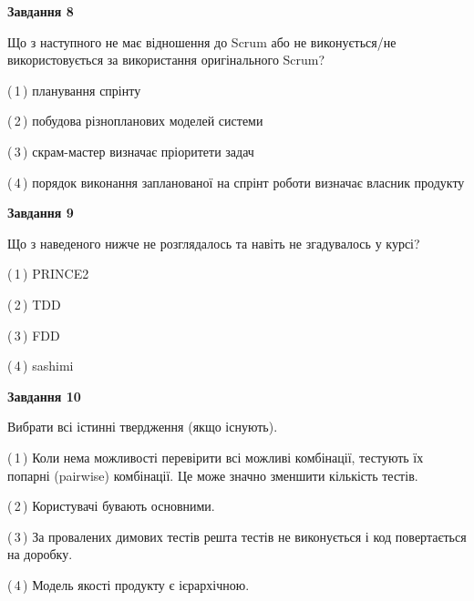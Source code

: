 \documentclass[10pt, ukrainian]{article}
\begin{document}
{\begin {large}
{\begin {center}\textbf{Завдання 8}\end {center}}\par
Що з наступного не має відношення до Scrum або не виконується/не використовується за використання оригінального Scrum?\par
\vspace{2mm}



(\,1\,) планування спрінту%



(\,2\,) побудова різнопланових моделей системи%



(\,3\,) скрам-мастер визначає пріоритети задач%



(\,4\,) порядок виконання запланованої на спрінт роботи визначає власник продукту%


{\begin {center}\textbf{Завдання 9}\end {center}}\par
Що з наведеного нижче не розглядалось та навіть не згадувалось у курсі?\par
\vspace{2mm}



(\,1\,) PRINCE2%



(\,2\,) TDD%



(\,3\,) FDD%



(\,4\,) sashimi%


{\begin {center}\textbf{Завдання 10}\end {center}}\par
Вибрати всі істинні твердження (якщо існують).\par
\vspace{2mm}



(\,1\,) Коли нема можливості перевірити всі можливі комбінації, тестують їх попарні (pairwise) комбінації. Це може значно зменшити кількість тестів.%



(\,2\,) Користувачі бувають основними.%



(\,3\,) За провалених димових тестів решта тестів не виконується і код повертається на доробку.%



(\,4\,) Модель якості продукту є ієрархічною.%



\end {large}}
\end{document}
